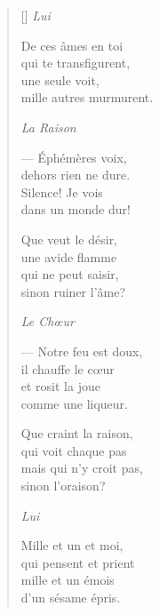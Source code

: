 \documentclass[11pt,a4paper]{article}
\begin{document}
\thispagestyle{empty}


\settowidth{\versewidth}{qui te transfigurent,}

\bigskip

\begin{verse}[\versewidth]
\emph{Lui}

De ces âmes en toi \\
qui te transfigurent, \\
une seule voit, \\
mille autres murmurent.

\emph{La Raison}

--- Éphémères voix, \\
dehors rien ne dure. \\
Silence! Je vois \\
dans un monde dur!

Que veut le désir, \\
une avide flamme \\
qui ne peut saisir, \\
sinon ruiner l'âme?

\emph{Le Chœur}

--- Notre feu est doux, \\
il chauffe le cœur \\
et rosit la joue \\
comme une liqueur.

Que craint la raison, \\
qui voit chaque pas \\
mais qui n'y croit pas, \\
sinon l'oraison?

\emph{Lui}

Mille et un et moi, \\
qui pensent et prient \\
mille et un émois \\
d'un sésame épris.
\end{verse}
\end{document}
